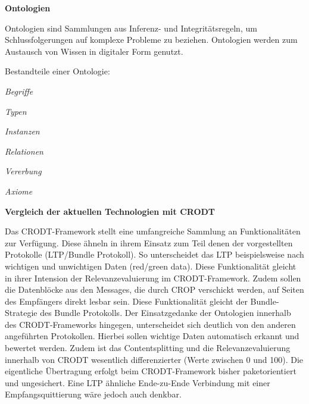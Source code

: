 \textbf{Ontologien}

Ontologien sind Sammlungen aus Inferenz- und Integrit{\"a}tsregeln, um
Schlussfolgerungen auf komplexe Probleme zu beziehen. Ontologien werden zum
Austausch von Wissen in digitaler Form genutzt.

Bestandteile einer Ontologie:

 \begin{compactenum}[I]
     \item \textit{Begriffe}
     \item \textit{Typen}
     \item \textit{Instanzen}
     \item \textit{Relationen}
     \item \textit{Vererbung}
     \item \textit{Axiome}
   \end{compactenum}
\newpage   
\textbf{Vergleich der aktuellen Technologien mit CRODT}

Das CRODT-Framework stellt eine umfangreiche Sammlung an Funktionalit{\"a}ten
zur Verf{\"u}gung. Diese {\"a}hneln in ihrem Einsatz zum Teil denen der
vorgestellten Protokolle (LTP/Bundle Protokoll). So unterscheidet das LTP
beispielsweise nach wichtigen und unwichtigen Daten (red/green data). Diese
Funktionalit{\"a}t gleicht in ihrer Intension der Relevanzevaluierung im
CRODT-Framework. Zudem sollen die Datenbl{\"o}cke aus den Messages, die durch
CROP verschickt werden, auf Seiten des Empf{\"a}ngers direkt lesbar sein. Diese
Funktionalit{\"a}t gleicht der Bundle-Strategie des Bundle Protokolls. Der
Einsatzgedanke der Ontologien innerhalb des CRODT-Frameworks hingegen,
unterscheidet sich deutlich von den anderen angef{\"u}hrten Protokollen. Hierbei
sollen wichtige Daten automatisch erkannt und bewertet werden. Zudem ist das
Contentsplitting und die Relevanzevaluierung innerhalb von CRODT wesentlich
differenzierter (Werte zwischen 0 und 100). Die eigentliche {\"U}bertragung
erfolgt beim CRODT-Framework bisher paketorientiert und ungesichert. Eine LTP
{\"a}hnliche Ende-zu-Ende Verbindung mit einer Empfangsquittierung w{\"a}re
jedoch auch denkbar.
